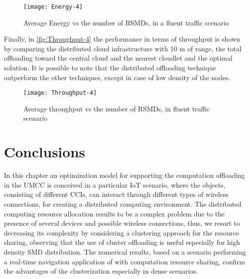 \documentclass[twoside,openright]{report}
\begin{document}
\begin{figure}[htbp]
\centering
\texttt{[image: Energy-4]}
\caption{Average Energy vs the number of RSMDs, in a fluent traffic scenario}
\label{fig:Energy-4}
\end{figure}

Finally, in \autoref{fig:Throughput-4} the performance in terms of throughput is shown by comparing the distributed cloud infrastructure with 10 m of range, the total offloading toward the central cloud and the nearest cloudlet and the optimal solution. It is possible to note that the  distributed offloading technique outperform the other techniques, except in case of low density of the nodes. %

\begin{figure}[tbp]
\centering
\texttt{[image: Throughput-4]}
\caption{Average throughput vs the number of RSMDs, in fluent traffic scenario}
\label{fig:Throughput-4}
\end{figure}


\section{Conclusions}
\label{sec:conclusions}
In this chapter an optimization model for supporting the computation offloading in the \gls{UMCC} is conceived in a particular \gls{IoT} scenario, where the objects, consisting of different \glspl{CCI}, can interact through different types of wireless connections, for creating a distributed computing environment. 
The distributed computing resource allocation results to be a complex problem due to the presence of several devices and possible wireless connections, thus, we resort to decreasing its complexity by considering a clustering approach for the resource sharing, observing that the use of cluster offloading is useful especially for high density \gls{SMD} distribution. The numerical results, based on a scenario performing a real-time navigation application of with computation resource sharing, confirm the advantages of the clusterization especially in dense scenarios.


\end{document}
